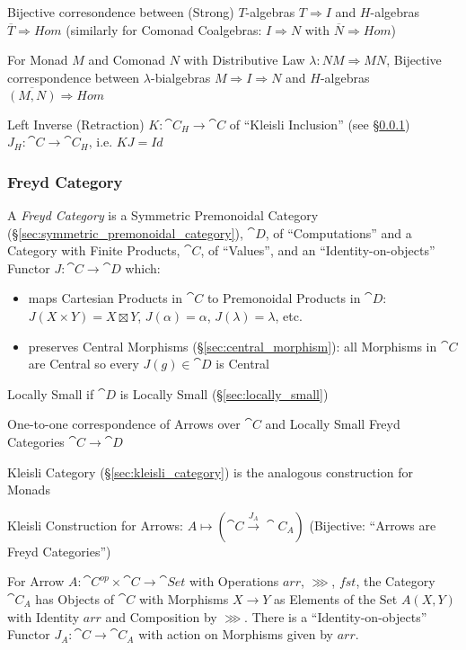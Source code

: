 Bijective corresondence between (Strong) $T$-algebras $T \Rightarrow
I$ and $H$-algebras $\overline{T} \Rightarrow Hom$ (similarly for
Comonad Coalgebras: $I \Rightarrow N$ with $\overline{N} \Rightarrow
Hom$)

For Monad $M$ and Comonad $N$ with Distributive Law $\lambda : N M
\Rightarrow M N$, Bijective correspondence between
$\lambda$-bialgebras $M \Rightarrow I \Rightarrow N$ and $H$-algebras
$\overline{(M,N)} \Rightarrow Hom$

Left Inverse (Retraction) $K : \cat{C}_H \rightarrow \cat{C}$ of
``Kleisli Inclusion'' (see \S\ref{sec:freyd_category}) $J_H : \cat{C}
\rightarrow \cat{C}_H$, i.e. $K J = Id$



\subsubsection{Freyd Category}\label{sec:freyd_category}

A \emph{Freyd Category} is a Symmetric Premonoidal Category
(\S\ref{sec:symmetric_premonoidal_category}), $\cat{D}$, of
``Computations'' and a Category with Finite Products, $\cat{C}$, of
``Values'', and an ``Identity-on-objects'' Functor $J : \cat{C}
\rightarrow \cat{D}$ which:
\begin{itemize}
\item maps Cartesian Products in $\cat{C}$ to Premonoidal Products in
  $\cat{D}$: $J(X \times Y) = X \boxtimes Y$, $J(\alpha) = \alpha$,
  $J(\lambda) = \lambda$, etc.
\item preserves Central Morphisms (\S\ref{sec:central_morphism}): all
  Morphisms in $\cat{C}$ are Central so every $J(g) \in \cat{D}$ is
  Central
\end{itemize}
\cite{jacobs-heunen-hasuo09}

Locally Small if $\cat{D}$ is Locally Small
(\S\ref{sec:locally_small})

One-to-one correspondence of Arrows over $\cat{C}$ and Locally Small
Freyd Categories $\cat{C} \rightarrow \cat{D}$

Kleisli Category (\S\ref{sec:kleisli_category}) is the analogous
construction for Monads

Kleisli Construction for Arrows: $A \mapsto (\cat{C} \xrightarrow{J_A}
\cat{C}_A)$ (Bijective: ``Arrows are Freyd Categories'')

For Arrow $A : \cat{C}^{op} \times \cat{C} \rightarrow \cat{Set}$ with
Operations $arr$, $\ggg$, $fst$, the Category $\cat{C}_A$ has Objects
of $\cat{C}$ with Morphisms $X \rightarrow Y$ as Elements of the Set
$A(X,Y)$ with Identity $arr$ and Composition by $\ggg$. There is a
``Identity-on-objects'' Functor $J_A : \cat{C} \rightarrow \cat{C}_A$
with action on Morphisms given by $arr$.

